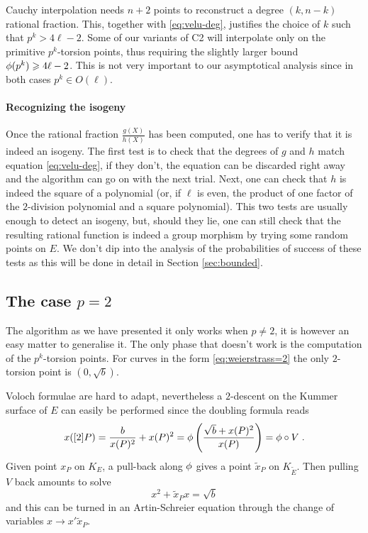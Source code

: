 Cauchy interpolation needs $n+2$ points to reconstruct a degree
$(k,n-k)$ rational fraction. This, together with \eqref{eq:velu-deg},
justifies the choice of $k$ such that $p^k > 4\ell - 2$. Some of our
variants of C2 will interpolate only on the primitive $p^k$-torsion
points, thus requiring the slightly larger bound $\phi(p^k) \geqslant
4\ell - 2$. This is not very important to our asymptotical analysis
since in both cases $p^k \in O(\ell)$.

\paragraph{Recognizing the isogeny}
Once the rational fraction $\frac{g(X)}{h(X)}$ has been computed, one
has to verify that it is indeed an isogeny. The first test is to check
that the degrees of $g$ and $h$ match equation \eqref{eq:velu-deg}, if
they don't, the equation can be discarded right away and the algorithm
can go on with the next trial. Next, one can check that $h$ is indeed
the square of a polynomial (or, if $\ell$ is even, the product of one
factor of the $2$-division polynomial and a square polynomial). This
two tests are usually enough to detect an isogeny, but, should they
lie, one can still check that the resulting rational function is
indeed a group morphism by trying some random points on $E$. We don't
dip into the analysis of the probabilities of success of these tests
as this will be done in detail in Section \ref{sec:bounded}.


\subsection{The case $p=2$}
\label{sec:p=2}
The algorithm as we have presented it only works when $p\ne2$, it is
however an easy matter to generalise it. The only phase that doesn't
work is the computation of the $p^k$-torsion points. For curves in the
form \eqref{eq:weierstrass=2} the only $2$-torsion point is
$(0,\sqrt{b})$.

Voloch formulae are hard to adapt, nevertheless a $2$-descent on the
Kummer surface of $E$ can easily be performed since the doubling
formula reads
\begin{equation}
  x([2]P) = \frac{b}{x(P)^2} + x(P)^2 =
  \phi\left(\frac{\sqrt{b} + x(P)^2}{x(P)} \right) = \phi\circ V
  \;\text{.}
\end{equation}
Given point $x_P$ on $K_E$, a pull-back along $\phi$ gives a
point $\tilde{x}_P$ on $K_{\widetilde{E}}$. Then pulling $V$ back
amounts to solve
\begin{equation}
  \label{eq:2-descent}
  x^2 + \tilde{x}_Px = \sqrt{b}
\end{equation}
and this can be turned in an Artin-Schreier equation through the
change of variables $x \rightarrow x'\tilde{x}_P$.

